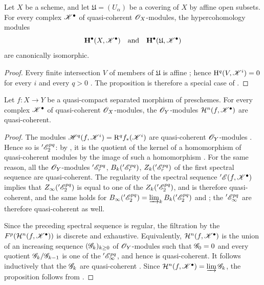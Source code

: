 \begin{proposition}[6.2.2]
\label{III.6.2.2}
Let $X$ be a scheme, and let $\mathfrak{U}=(U_\alpha)$ be a
covering of $X$ by affine open subsets.  For every complex
$\mathscr{K}^\bullet$ of quasi-coherent $\mathscr{O}_X$-modules, the
hypercohomology modules
\[
  \mathbf{H}^\bullet(X,\mathscr{K}^\bullet)
  \quad\text{and}\quad
  \mathbf{H}^\bullet(\mathfrak{U},\mathscr{K}^\bullet)
\]
are canonically isomorphic.
\end{proposition}

\begin{proof}
Every finite intersection $V$ of members of $\mathfrak{U}$ is
affine ; hence
$\mathrm{H}^q(V,\mathscr{K}^i)=0$ for every $i$ and every $q>0$
.  The proposition is therefore a special case of
.
\end{proof}

\begin{proposition}[6.2.3]
\label{III.6.2.3}
Let $f:X\to Y$ be a quasi-compact separated morphism of
preschemes.  For every complex $\mathscr{K}^\bullet$ of quasi-coherent
$\mathscr{O}_X$-modules, the $\mathscr{O}_Y$-modules
$\mathcal{H}^n(f,\mathscr{K}^\bullet)$ are quasi-coherent.
\end{proposition}

\begin{proof}
The modules $\mathscr{H}^q(f,\mathscr{K}^i)=\mathrm{R}^qf_*(\mathscr{K}^i)$
are quasi-coherent $\mathscr{O}_Y$-modules .  Hence so
is $'\mathscr{E}_2^{pq}$: by , it is the quotient of
the kernel of a homomorphism of quasi-coherent modules by the image
of such a homomorphism .  For the same reason, all
the $\mathscr{O}_Y$-modules $'\mathscr{E}_r^{pq}$, $B_k('\mathscr{E}_r^{pq})$,
$Z_k('\mathscr{E}_r^{pq})$ of the first spectral sequence are
quasi-coherent.  The regularity of the spectral sequence
$'\mathscr{E}(f,\mathscr{K}^\bullet)$ implies that
$Z_\infty('\mathscr{E}_2^{pq})$ is equal to one of the
$Z_k('\mathscr{E}_2^{pq})$, and is therefore quasi-coherent,
and the same holds for $B_\infty('\mathscr{E}_2^{pq})
=
\varinjlim_k B_k('\mathscr{E}_2^{pq})$
 and ; the
$'\mathscr{E}_\infty^{pq}$ are therefore quasi-coherent as well.

Since the preceding spectral sequence is regular, the filtration by the
$F^p(\mathcal{H}^n(f,\mathscr{K}^\bullet))$ is discrete and
exhaustive.  Equivalently,
$\mathcal{H}^n(f,\mathscr{K}^\bullet)$ is the union of an increasing
sequence $(\mathscr{G}_k)_{k\geq0}$ of $\mathscr{O}_Y$-modules such that
$\mathscr{G}_0=0$ and every quotient
$\mathscr{G}_k/\mathscr{G}_{k-1}$ is one of the
$'\mathscr{E}_\infty^{pq}$, and hence is quasi-coherent.  It follows
inductively that the $\mathscr{G}_k$ are quasi-coherent
.  Since $\mathcal{H}^n(f,\mathscr{K}^\bullet)
=
\varinjlim\mathscr{G}_k$,
the proposition follows from .
\end{proof}

